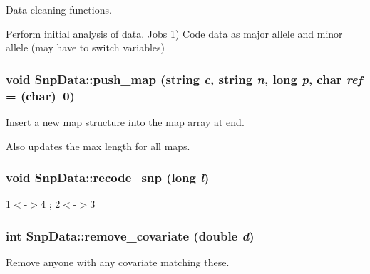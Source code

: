 Data cleaning functions. 

Perform initial analysis of data. Jobs 1) Code data as major allele and minor allele (may have to switch variables) \hypertarget{classSnpData_afde9baf5271d4ccd8a47bba6a7a3a25c}{
\subsubsection[{push\_\-map}]{\setlength{\rightskip}{0pt plus 5cm}void SnpData::push\_\-map (string {\em c}, \/  string {\em n}, \/  long {\em p}, \/  char {\em ref} = {\ttfamily (char)~0})}}
\label{classSnpData_afde9baf5271d4ccd8a47bba6a7a3a25c}
Insert a new map structure into the map array at end.

Also updates the max length for all maps. \hypertarget{classSnpData_afe4142e4ebec9142c79962b229208f7b}{
\subsubsection[{recode\_\-snp}]{\setlength{\rightskip}{0pt plus 5cm}void SnpData::recode\_\-snp (long {\em l})}}
\label{classSnpData_afe4142e4ebec9142c79962b229208f7b}
1$<$-\/$>$4 ; 2$<$-\/$>$3 \hypertarget{classSnpData_a9fa11c7060c6eba27c09c38c8366d8d1}{
\subsubsection[{remove\_\-covariate}]{\setlength{\rightskip}{0pt plus 5cm}int SnpData::remove\_\-covariate (double {\em d})}}
\label{classSnpData_a9fa11c7060c6eba27c09c38c8366d8d1}
Remove anyone with any covariate matching these.



